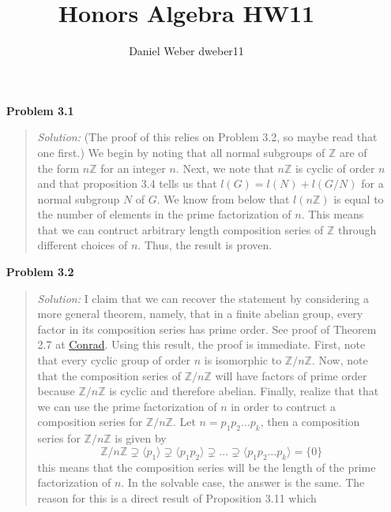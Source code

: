 \documentclass{article}
\title{Honors Algebra HW11}
\author{Daniel Weber dweber11}
\newcommand{\Solution}{\textit{Solution: }}
\begin{document}
    \maketitle
    \begin{enumerate}
        \item[\textbf{Problem 3.1}]
        \begin{quote}
            \Solution (The proof of this relies on Problem 3.2, so maybe read that one first.) We begin by noting that all normal subgroups of $\mathbb{Z}$ are of the form $n\mathbb{Z}$ for an 
            integer $n$. Next, we note that $n\mathbb{Z}$ is cyclic of order $n$ and that proposition 3.4 tells us that $l(G) = l(N) + l(G/N)$ for a normal subgroup $N$ of $G$. We know from below that 
            $l(n\mathbb{Z})$ is equal to the number of elements in the prime factorization of $n$. This means that we can contruct arbitrary length composition series of $\mathbb{Z}$ through different
            choices of $n$. Thus, the result is proven. \qedsymbol
        \end{quote} 
        \item[\textbf{Problem 3.2}]
        \begin{quote}
            \Solution I claim that we can recover the statement by considering a more general theorem, namely, that in a finite abelian group, every factor in its composition series has prime order. 
            See proof of Theorem 2.7 at \href{https://kconrad.math.uconn.edu/blurbs/grouptheory/subgpseries1.pdf}{Conrad}. Using this result, the proof is immediate. First, note that every cyclic group of order $n$ is isomorphic
            to $\mathbb{Z}/n\mathbb{Z}$. Now, note that the composition series of $\mathbb{Z}/n\mathbb{Z}$ will have factors of prime order because $\mathbb{Z}/n\mathbb{Z}$ is cyclic and therefore abelian. Finally, realize that 
            that we can use the prime factorization of $n$ in order to contruct a composition series for $\mathbb{Z}/n\mathbb{Z}$. Let $n = p_1p_2\dots p_k$, then a composition series for $\mathbb{Z}/n\mathbb{Z}$ is given by 
            \begin{equation*}
                \mathbb{Z}/n\mathbb{Z} \supsetneq \langle p_1 \rangle \supsetneq \langle p_1p_2 \rangle \supsetneq \dots \supsetneq \langle p_1p_2\dots p_k \rangle = \{0\}
            \end{equation*} this means that the composition series will be the length of the prime factorization of $n$. In the solvable case, the answer is the same. The reason for this is a direct result of Proposition 3.11 which 

\end{quote}
\end{enumerate}
\end{document}
